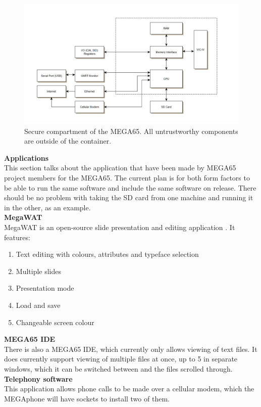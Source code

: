 \begin{figure} \begin{center}
\includegraphics[width=.3\linewidth]{pics/secure_compartment} 
\end{center} 
\caption{Secure compartment of the MEGA65. All untrustworthy components are outside of the container.\\}
\label{secure_compartment}
\end{figure}

\textbf{Applications}\\
This section talks about the application that have been made by MEGA65 project members for the MEGA65. The current plan is for both form factors to be able to run the same software and include the same software on release. There should be no problem with taking the SD card from one machine and running it in the other, as an example.\\

\textbf{MegaWAT} \\
MegaWAT is an open-source slide presentation and editing application \cite{RN163}. It features:
\begin{enumerate}
\item Text editing with colours, attributes and typeface selection
\item Multiple slides
\item Presentation mode
\item Load and save
\item Changeable screen colour
\end{enumerate}

\textbf{MEGA65 IDE}\\
There is also a MEGA65 IDE, which currently only allows viewing of text files. It does currently support viewing of multiple files at once, up to 5 in separate windows, which it can be switched between and the files scrolled through.\\

\textbf{Telephony software}\\
This application allows phone calls to be made over a cellular modem, which the MEGAphone will have sockets to install two of them. \\


